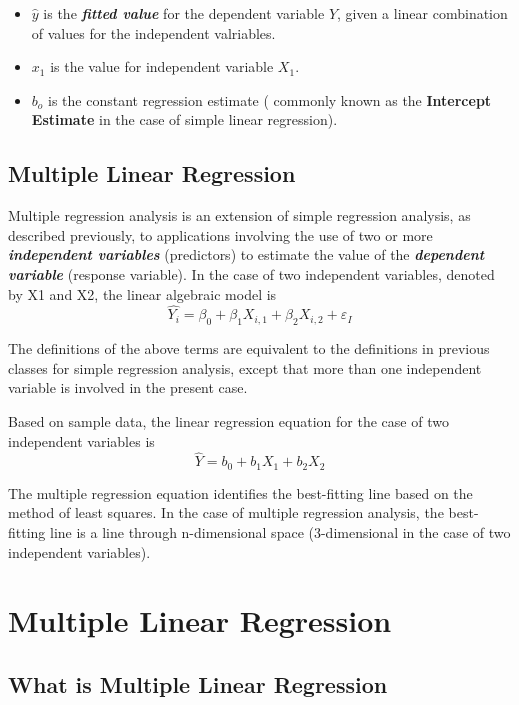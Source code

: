 \begin{itemize}
\item $\hat{y}$ is the \textbf{\textit{fitted value}} for the dependent variable \textbf{$Y$}, given a linear combination of values for the independent valriables.

\item $x_1$ is the value for independent variable \textbf{$X_1$}.
\item $b_o$ is the constant regression estimate ( commonly known as the \textbf{Intercept Estimate} in the case of simple linear regression).
\end{itemize}
\newpage
\subsection*{Multiple Linear Regression}


Multiple regression analysis is an extension of simple regression analysis, as described previously, to applications involving the use of two or more \textbf{\textit{independent variables}} (predictors) to estimate the value of the \textbf{\textit{dependent variable}} (response variable).
In the case of two independent variables, denoted by X1 and X2, the linear algebraic model is
\[ \hat{Y_i} = \beta_0 + \beta_1X_{i,1} + \beta_2X_{i,2} +\varepsilon_I\]

The definitions of the above terms are equivalent to the definitions in previous classes for simple regression analysis, except that more than one independent variable is involved in the present case.

Based on sample data, the linear regression equation for the case of two independent variables is
\[ \hat{Y} = b_0 + b_1X_1 + b_2X_2 \]

The multiple regression equation identifies the best-fitting line based on the method of least squares. In the case of multiple regression analysis, the best-fitting line is a line through
n-dimensional space (3-dimensional in the case of two independent variables).


\section{Multiple Linear Regression}
\subsection{What is Multiple Linear Regression}


